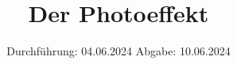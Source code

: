 

\subject{v500}
\title{Der Photoeffekt}
\date{%
  Durchführung: 04.06.2024
  \hspace{3em}
  Abgabe: 10.06.2024
}



\maketitle
\thispagestyle{empty}
\tableofcontents
\newpage






\printbibliography{}

